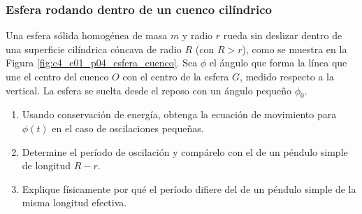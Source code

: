 \subsubsection{Esfera rodando dentro de un cuenco cilíndrico}

Una esfera sólida homogénea de masa $m$ y radio $r$ rueda sin deslizar dentro de una superficie cilíndrica cóncava de radio $R$ (con $R > r$), como se muestra en la Figura \ref{fig:c4_e01_p04_esfera_cuenco}. Sea $\phi$ el ángulo que forma la línea que une el centro del cuenco $O$ con el centro de la esfera $G$, medido respecto a la vertical. La esfera se suelta desde el reposo con un ángulo pequeño $\phi_0$.

\begin{enumerate}
    \item Usando conservación de energía, obtenga la ecuación de movimiento para $\phi(t)$ en el caso de oscilaciones pequeñas.
    \item Determine el período de oscilación y compárelo con el de un péndulo simple de longitud $R-r$.
    \item Explique físicamente por qué el período difiere del de un péndulo simple de la misma longitud efectiva.
\end{enumerate}

